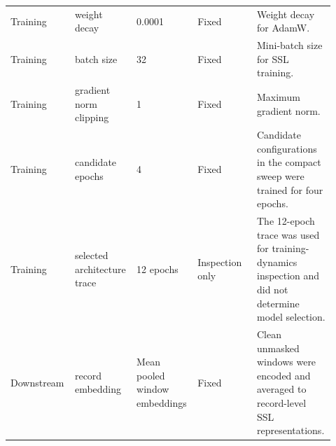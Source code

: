 \documentclass[utf8]{frontiers_suppmat}
\begin{document}
\begin{landscape}
\begin{longtable}{L{0.184\linewidth} L{0.184\linewidth} L{0.184\linewidth} L{0.184\linewidth} L{0.184\linewidth}}
Training & weight decay & 0.\allowbreak{}0001 & Fixed & Weight decay for AdamW.\allowbreak{} \\
Training & batch size & 32 & Fixed & Mini-\allowbreak{}batch size for SSL training.\allowbreak{} \\
Training & gradient norm clipping & 1 & Fixed & Maximum gradient norm.\allowbreak{} \\
Training & candidate epochs & 4 & Fixed & Candidate configurations in the compact sweep were trained for four epochs.\allowbreak{} \\
Training & selected architecture trace & 12 epochs & Inspection only & The 12-\allowbreak{}epoch trace was used for training-\allowbreak{}dynamics inspection and did not determine model selection.\allowbreak{} \\
Downstream & record embedding & Mean pooled window embeddings & Fixed & Clean unmasked windows were encoded and averaged to record-\allowbreak{}level SSL representations.\allowbreak{} \\
\end{longtable}
\normalsize
\end{landscape}
\end{document}
